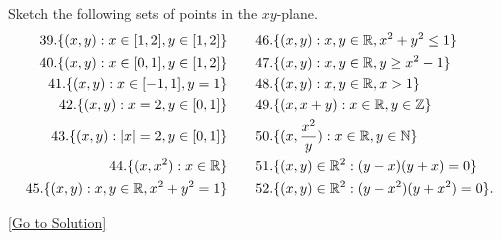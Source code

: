\begin{exercise}\label{ex:1.4}
    Sketch the following sets of points in the $xy$-plane. 
    $$
    \begin{aligned}
    39. \{ (x,y): x\in[1,2],y\in[1,2] \} &\quad\quad 46. \{ (x,y):x,y\in\mathbb{R}, x^2+y^2\le1 \}\\
    40. \{ (x,y): x\in[0,1],y\in[1,2] \} &\quad\quad 47. \{ (x,y):x,y\in\mathbb{R},y\ge x^2-1 \}\\
    41. \{ (x,y):x\in[-1,1],y=1 \} &\quad\quad 48. \{ (x,y):x,y\in\mathbb{R},x>1 \}\\
    42. \{ (x,y): x=2, y\in[0,1] \} &\quad\quad 49. \{ (x,x+y):x\in\mathbb{R},y\in\mathbb{Z} \}\\
    43. \{ (x,y): \lvert x \rvert=2,y\in[0,1] \} &\quad\quad 50. \{ (x,\frac{x^2}{y}):x\in\mathbb{R},y\in\mathbb{N} \}\\
    44. \{ (x,x^2):x\in\mathbb{R} \} &\quad\quad 51. \{ (x,y)\in\mathbb{R}^2:(y-x)(y+x)=0 \}\\
    45. \{ (x,y):x,y\in\mathbb{R},x^2+y^2=1 \} &\quad\quad 52. \{ (x,y)\in\mathbb{R}^2:(y-x^2)(y+x^2)=0 \}.
    \end{aligned}
    $$
\end{exercise}\hyperref[sol:1.4]{[Go to Solution]}